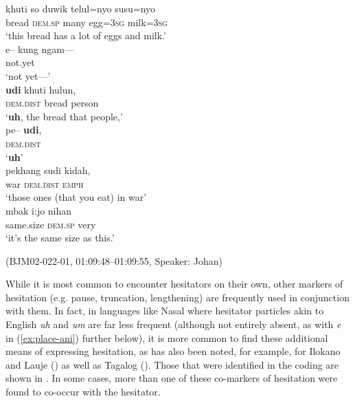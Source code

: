\documentclass[output=paper,colorlinks,citecolor=brown
\ChapterDOI{10.5281/zenodo.15697585}
]{langscibook}
\begin{document}
\begin{exe}
    \ex\label{ex:udi-hes} \begin{xlist}[0\quad →A:]
         \gll
        khuti so duwik telul=nyo susu=nyo \\
        bread \textsc{dem.sp} many egg=3\textsc{sg} milk=3\textsc{sg} \\
        \glt `this bread has a lot of eggs and milk.' \\
        \exi{2\quad \hphantom{→J:}} \gll
        e-- kung ngam--- \\
        {} not.yet {} \\
        \glt `not yet---' \\
         \gll
        \textbf{udi} khuti hulun, \\
        \textsc{dem.dist} bread person \\
        \glt `\textbf{uh}, the bread that people,' \\
         \gll
        pe-- \textbf{udi}, \\
        {} \textsc{dem.dist} \\
        \glt `\textbf{uh}' \\
        \exi{5\quad \hphantom{→J:}} \gll
        pekhang sudi kidah, \\
        war \textsc{dem.dist} \textsc{emph} \\
        \glt `those ones (that you eat) in war' \\
        \exi{6\quad \hphantom{→J:}} \gll
        mbak i:jo nihan \\
        same.size \textsc{dem.sp} very \\
        \glt `it's the same size as this.' \\
    \end{xlist}
    \hfill (BJM02-022-01, 01:09:48–01:09:55, Speaker: Johan) 
\end{exe}

While it is most common to encounter hesitators on their own, other markers of hesitation (e.g. pause, truncation, lengthening) are frequently used in conjunction with them. In fact, in languages like Nasal where hesitator particles akin to English \textit{uh} and \textit{um} are far less frequent (although not entirely absent, as with \textit{e} in (\ref{ex:place-ani}) further below), it is more common to find these additional means of expressing hesitation, as has also been noted, for example, for Ilokano and Lauje (\cite{streeck_1996}) as well as Tagalog (\cite{himmelmann2014prosodicphrasing}). Those that were identified in the coding are shown in . In some cases, more than one of these co-markers of hesitation were found to co-occur with the hesitator.
\end{document}
